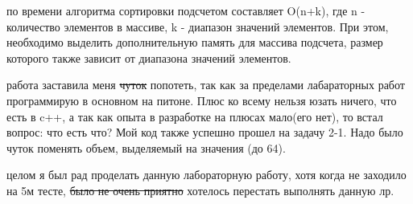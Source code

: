 \documentclass[12pt]{article}
\begin{document}
 по времени алгоритма сортировки подсчетом составляет O(n+k), где n - количество элементов в массиве, k - диапазон значений элементов. При этом, необходимо выделить дополнительную память для массива подсчета, размер которого также зависит от диапазона значений элементов.

 работа заставила меня \sout{чуток} попотеть, так как за пределами лабараторных работ программирую в основном на питоне. Плюс ко всему нельзя юзать ничего, что есть в c++, а так как опыта в разработке на плюсах мало(его нет), то встал вопрос: что есть что? Мой код также успешно прошел на задачу 2-1. Надо было чуток поменять объем, выделяемый на значения (до 64). 

 целом я был рад проделать данную лабораторную работу, хотя когда не заходило на 5м тесте, \sout{было не очень приятно} хотелось перестать выполнять данную лр.  
\end{document}
